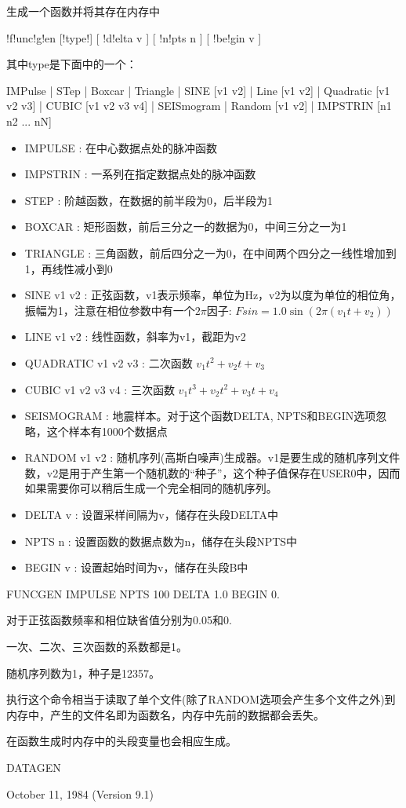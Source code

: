 \label{cmd:funcgen}

生成一个函数并将其存在内存中

\begin{SACSTX}
!f!unc!g!en [!type!] [ !d!elta v ] [ !n!pts n ] [ !be!gin v ]
\end{SACSTX}

其中type是下面中的一个：

IMPulse | STep | Boxcar | Triangle | SINE [v1 v2] | Line [v1 v2] |
Quadratic [v1 v2 v3] | CUBIC [v1 v2 v3 v4] | SEISmogram | Random [v1 v2]
| IMPSTRIN  [n1 n2 ... nN]

\begin{itemize}
\item IMPULSE : 在中心数据点处的脉冲函数 
\item IMPSTRIN : 一系列在指定数据点处的脉冲函数  
\item STEP :  阶越函数，在数据的前半段为0，后半段为1 
\item BOXCAR : 矩形函数，前后三分之一的数据为0，中间三分之一为1 
\item TRIANGLE : 三角函数，前后四分之一为0，在中间两个四分之一线性增加到1，再线性减小到0 
\item SINE v1 v2 : 正弦函数，v1表示频率，单位为Hz，v2为以度为单位的相位角，振幅为1，注意在相位参数中有一个$2\pi$因子: $ Fsin = 1.0 \sin (2\pi (v_1t+v_2))$ 
\item LINE v1 v2 : 线性函数，斜率为v1，截距为v2 
\item QUADRATIC v1 v2 v3 : 二次函数 $v_1 t^{2} + v_2 t + v_3 $
\item CUBIC v1 v2 v3 v4 : 三次函数 $ v_1 t^{3} + v_2 t^2 + v_3t + v_4 $
\item SEISMOGRAM : 地震样本。对于这个函数DELTA, NPTS和BEGIN选项忽略，这个样本有1000个数据点 
\item RANDOM v1 v2 :  随机序列(高斯白噪声)生成器。v1是要生成的随机序列文件数，v2是用于产生第一个随机数的``种子''，这个种子值保存在USER0中，因而如果需要你可以稍后生成一个完全相同的随机序列。 
\item DELTA v : 设置采样间隔为v，储存在头段DELTA中 
\item NPTS n : 设置函数的数据点数为n，储存在头段NPTS中 
\item BEGIN v : 设置起始时间为v，储存在头段B中 
\end{itemize}

FUNCGEN IMPULSE NPTS 100 DELTA 1.0 BEGIN 0.

对于正弦函数频率和相位缺省值分别为0.05和0.

一次、二次、三次函数的系数都是1。

随机序列数为1，种子是12357。

执行这个命令相当于读取了单个文件(除了RANDOM选项会产生多个文件之外)到内存中，产生的文件名即为函数名，内存中先前的数据都会丢失。

在函数生成时内存中的头段变量也会相应生成。

DATAGEN

October 11, 1984 (Version 9.1)
